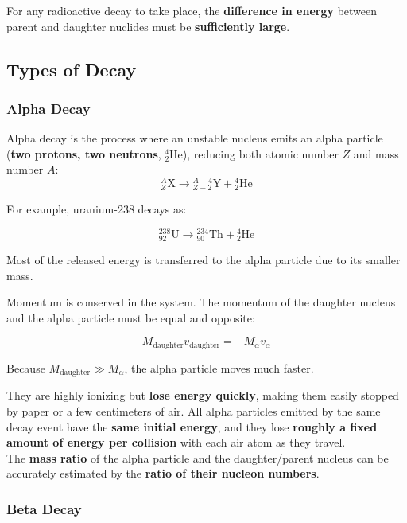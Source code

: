 \documentclass[a4paper,12pt]{article}
\newcommand{\lb}{\\[8pt]}
\newcommand{\atom}[3]{{}^{#1}_{#2}\text{#3}}
\begin{document}
For any radioactive decay to take place, the \textbf{difference in energy} between parent and daughter nuclides must be \textbf{sufficiently large}.

\pagebreak

\subsection{Types of Decay}

\subsubsection{Alpha Decay}

Alpha decay is the process where an unstable nucleus emits an alpha particle (\textbf{two protons, two neutrons}, $^4_2\text{He}$), reducing both atomic number $Z$ and mass number $A$:
\[
  \atom{A}{Z}{X} \rightarrow \atom{A-4}{Z-2}{Y} + \atom{4}{2}{He}
\]

For example, uranium-238 decays as:

\[
  \atom{238}{92}{U} \rightarrow \atom{234}{90}{Th} + \atom{4}{2}{He}
\]

Most of the released energy is transferred to the alpha particle due to its smaller mass.

Momentum is conserved in the system. The momentum of the daughter nucleus and the alpha particle must be equal and opposite:

\[
  M_{\text{daughter}} v_{\text{daughter}} = - M_{\alpha} v_{\alpha}
\]

Because $M_{\text{daughter}} \gg M_{\alpha}$, the alpha particle moves much faster.

They are highly ionizing but \textbf{lose energy quickly}, making them easily stopped by paper or a few centimeters of air. All alpha particles emitted by the same decay event have the \textbf{same initial energy}, and they lose \textbf{roughly a fixed amount of energy per collision} with each air atom as they travel.\lb

The \textbf{mass ratio} of the alpha particle and the daughter/parent nucleus can be accurately estimated by the \textbf{ratio of their nucleon numbers}.

\pagebreak

\subsubsection{Beta Decay}
\end{document}
